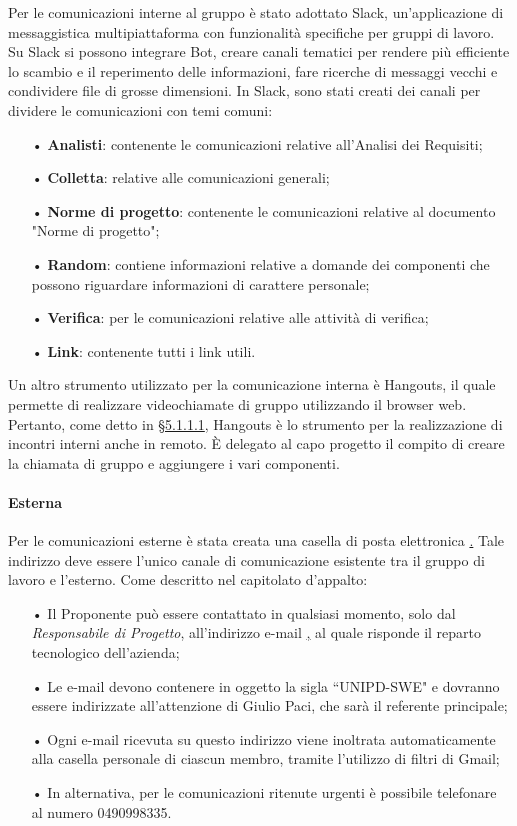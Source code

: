 Per le comunicazioni interne al gruppo è stato adottato {Slack}, un'applicazione di messaggistica multipiattaforma con funzionalità specifiche per gruppi di lavoro.  
\newline
Su Slack si possono integrare {Bot}, creare canali tematici per rendere più efficiente lo scambio e il reperimento delle informazioni, fare ricerche di messaggi vecchi e condividere file di grosse dimensioni.   
\newline
In Slack, sono stati creati dei canali per dividere le comunicazioni con temi comuni:
\begin{itemize}
\item[•] \textbf{Analisti}: contenente le comunicazioni relative all'Analisi dei Requisiti;
\item[•] \textbf{Colletta}: relative alle comunicazioni generali;
\item[•] \textbf{Norme di progetto}: contenente le comunicazioni relative al documento "Norme di progetto";
\item[•] \textbf{Random}: contiene informazioni relative a domande dei componenti che possono riguardare informazioni di carattere personale;
\item[•] \textbf{Verifica}: per le comunicazioni relative alle attività di verifica;
\item[•] \textbf{Link}: contenente tutti i link utili.
\end{itemize}
Un altro strumento utilizzato per la comunicazione interna è Hangouts, il quale permette di realizzare videochiamate di gruppo utilizzando il browser web. Pertanto, come detto in \hyperref[sec:interni]{§5.1.1.1}, Hangouts è lo strumento per la realizzazione di incontri interni anche in remoto. \uppercase{è} delegato al capo progetto il compito di creare la chiamata di gruppo e aggiungere i vari componenti.
\paragraph{Esterna}
Per le comunicazioni esterne è stata creata una casella di posta elettronica \href{SWEight@gmail.com}.
\newline 
Tale indirizzo deve essere l'unico canale di comunicazione esistente tra il gruppo di lavoro e l'esterno. 
\newline
Come descritto nel capitolato d'appalto: 
\begin{itemize}
\item[•] Il Proponente può essere contattato in qualsiasi momento, solo dal \textit{Responsabile di Progetto}, all'indirizzo e-mail \href{tech@mivoq.it} , al quale risponde il reparto tecnologico dell'azienda;
\item[•] Le e-mail devono contenere in oggetto la sigla “UNIPD-SWE" e dovranno essere indirizzate all'attenzione di Giulio Paci, che sarà il referente principale;
\item[•] Ogni e-mail ricevuta su questo indirizzo viene inoltrata automaticamente alla casella personale di ciascun membro, tramite l'utilizzo di filtri di Gmail;
\item[•] In alternativa, per le comunicazioni ritenute urgenti è possibile telefonare al numero 0490998335.
\end{itemize}

